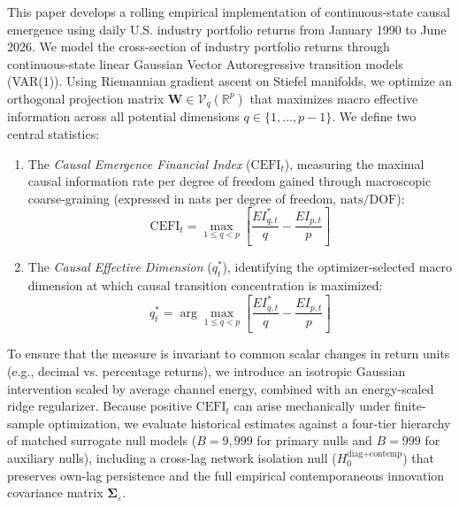 \documentclass[review,12pt,authoryear]{elsarticle}
\begin{document}
This paper develops a rolling empirical implementation of continuous-state causal emergence using daily U.S. industry portfolio returns from January 1990 to June 2026. We model the cross-section of industry portfolio returns through continuous-state linear Gaussian Vector Autoregressive transition models (VAR(1)). Using Riemannian gradient ascent on Stiefel manifolds, we optimize an orthogonal projection matrix $\mathbf{W} \in \mathcal{V}_q(\mathbb{R}^p)$ that maximizes macro effective information across all potential dimensions $q \in \{1, \dots, p-1\}$. We define two central statistics:
\begin{enumerate}[label=(\roman*)]
    \item The \emph{Causal Emergence Financial Index} ($\mathrm{CEFI}_t$), measuring the maximal causal information rate per degree of freedom gained through macroscopic coarse-graining (expressed in nats per degree of freedom, $\mathrm{nats/DOF}$):
    \begin{equation}
    \mathrm{CEFI}_t = \max_{1 \le q < p} \left[ \frac{EI_{q,t}^*}{q} - \frac{EI_{p,t}}{p} \right]
    \end{equation}
    \item The \emph{Causal Effective Dimension} ($q_t^*$), identifying the optimizer-selected macro dimension at which causal transition concentration is maximized:
    \begin{equation}
    q_t^* = \arg\max_{1 \le q < p} \left[ \frac{EI_{q,t}^*}{q} - \frac{EI_{p,t}}{p} \right]
    \end{equation}
\end{enumerate}

To ensure that the measure is invariant to common scalar changes in return units (e.g., decimal vs. percentage returns), we introduce an isotropic Gaussian intervention scaled by average channel energy, combined with an energy-scaled ridge regularizer. Because positive $\mathrm{CEFI}_t$ can arise mechanically under finite-sample optimization, we evaluate historical estimates against a four-tier hierarchy of matched surrogate null models ($B=9,999$ for primary nulls and $B=999$ for auxiliary nulls), including a cross-lag network isolation null ($H_0^{\text{diag+contemp}}$) that preserves own-lag persistence and the full empirical contemporaneous innovation covariance matrix $\boldsymbol{\Sigma}_\varepsilon$.
\end{document}
